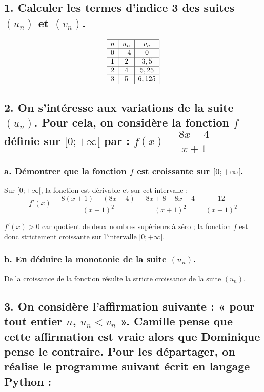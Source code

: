 \subsection*{1. Calculer les termes d'indice 3 des suites $(u_n)$ et $(v_n)$.}
	
	\[
	\begin{array}{|c|c|c|}
		\hline
			n & u_n & v_n \\
		\hline
		0 & -4 & 0 \\
			\hline
		1 & 2 & 3,5 \\
			\hline
		2 & 4 & 5,25 \\
			\hline
		3 & 5 & 6,125 \\
			\hline
	\end{array}
	\]
	
	\subsection*{2. On s'intéresse aux variations de la suite $(u_n)$. Pour cela, on considère la fonction $f$ définie sur $[0; +\infty[$ par : $f(x) = \dfrac{8x - 4}{x + 1}$}
	
	\subsubsection*{a. Démontrer que la fonction $f$ est croissante sur $[0; +\infty[$.}
	
	Sur $[0; +\infty[$, la fonction est dérivable et sur cet intervalle :
	\[
	f'(x) = \dfrac{8(x + 1) - (8x - 4)}{(x + 1)^2} = \dfrac{8x + 8 - 8x + 4}{(x + 1)^2} = \dfrac{12}{(x + 1)^2}
	\]
	
	$f'(x) > 0$ car quotient de deux nombres supérieurs à zéro ; la fonction $f$ est donc strictement croissante sur l'intervalle $[0; +\infty[$.
	
	\subsubsection*{b. En déduire la monotonie de la suite $(u_n)$.}
	
	De la croissance de la fonction résulte la stricte croissance de la suite $(u_n)$.
	
	\subsection*{3. On considère l'affirmation suivante : « pour tout entier $n$, $u_n < v_n$ ». Camille pense que cette affirmation est vraie alors que Dominique pense le contraire. Pour les départager, on réalise le programme suivant écrit en langage Python :}
	
